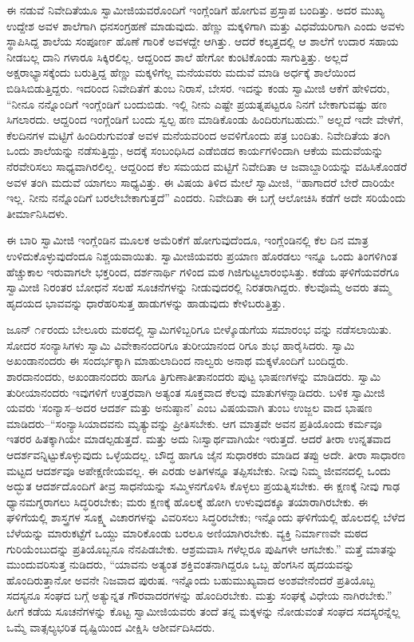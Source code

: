 ಈ ನಡುವೆ ನಿವೇದಿತೆಯೂ ಸ್ವಾಮೀಜಿಯವರೊಂದಿಗೆ ಇಂಗ್ಲೆಂಡಿಗೆ ಹೋಗುವ ಪ್ರಸ್ತಾಪ ಬಂದಿತ್ತು. ಅದರ ಮುಖ್ಯ ಉದ್ದೇಶ ಅವಳ ಶಾಲೆಗಾಗಿ ಧನಸಂಗ್ರಹಣೆ ಮಾಡುವುದು. ಹೆಣ್ಣು ಮಕ್ಕಳಿಗಾಗಿ ಮತ್ತು ವಿಧವೆಯರಿಗಾಗಿ ಎಂದು ಅವಳು ಸ್ಥಾಪಿಸಿದ್ದ ಶಾಲೆಯ ಸಂಪೂರ್ಣ ಹೊಣೆ ಗಾರಿಕೆ ಅವಳದ್ದೇ ಆಗಿತ್ತು. ಆದರೆ ಕಲ್ಕತ್ತದಲ್ಲಿ ಆ ಶಾಲೆಗೆ ಉದಾರ ಸಹಾಯ ನೀಡಬಲ್ಲ ದಾನಿ ಗಳಾರೂ ಸಿಕ್ಕಿರಲಿಲ್ಲ. ಆದ್ದರಿಂದ ಶಾಲೆ ಹೇಗೋ ಕುಂಟಿಕೊಂಡು ಸಾಗುತ್ತಿತ್ತು. ಅಲ್ಲದೆ ಅಕ್ಷರಾಭ್ಯಾಸಕ್ಕೆಂದು ಬರುತ್ತಿದ್ದ ಹೆಣ್ಣು ಮಕ್ಕಳಿಗೆಲ್ಲ ಮನೆಯವರು ಮದುವೆ ಮಾಡಿ ಅರ್ಧಕ್ಕೆ ಶಾಲೆಯಿಂದ ಬಿಡಿಸಿಬಿಡುತ್ತಿದ್ದರು. ಇದರಿಂದ ನಿವೇದಿತೆಗೆ ತುಂಬ ನಿರಾಸೆ, ಬೇಸರ. ಇದನ್ನು ಕಂಡು ಸ್ವಾಮೀಜಿ ಆಕೆಗೆ ಹೇಳಿದರು, “ನೀನೂ ನನ್ನೊಂದಿಗೆ ಇಂಗ್ಲೆಂಡಿಗೆ ಬಂದುಬಿಡು. ಇಲ್ಲಿ ನೀನು ಎಷ್ಟೇ ಪ್ರಯತ್ನಪಟ್ಟರೂ ನಿನಗೆ ಬೇಕಾಗುವಷ್ಟು ಹಣ ಸಿಗಲಾರದು. ಆದ್ದರಿಂದ ಇಂಗ್ಲೆಂಡಿಗೆ ಬಂದು ಸ್ವಲ್ಪ ಹಣ ಮಾಡಿಕೊಂಡು ಹಿಂದಿರುಗಬಹುದು.” ಅಲ್ಲದೆ ಇದೇ ವೇಳೆಗೆ, ಕೆಲದಿನಗಳ ಮಟ್ಟಿಗೆ ಹಿಂದಿರುಗುವಂತೆ ಅವಳ ಮನೆಯವರಿಂದ ಅವಳಿಗೊಂದು ಪತ್ರ ಬಂದಿತು. ನಿವೇದಿತೆಯ ತಂಗಿ ಒಂದು ಶಾಲೆಯನ್ನು ನಡೆಸುತ್ತಿದ್ದು, ಅದಕ್ಕೆ ಸಂಬಂಧಿಸಿದ ಎಡೆಬಿಡದ ಕಾರ್ಯಗಳಿಂದಾಗಿ ಆಕೆಯ ಮದುವೆಯನ್ನು ನೆರವೇರಿಸಲು ಸಾಧ್ಯವಾಗಿರಲಿಲ್ಲ. ಆದ್ದರಿಂದ ಕೆಲ ಸಮಯದ ಮಟ್ಟಿಗೆ ನಿವೇದಿತಾ ಆ ಜವಾಬ್ದಾರಿಯನ್ನು ವಹಿಸಿಕೊಂಡರೆ ಅವಳ ತಂಗಿ ಮದುವೆ ಯಾಗಲು ಸಾಧ್ಯವಿತ್ತು. ಈ ವಿಷಯ ತಿಳಿದ ಮೇಲೆ ಸ್ವಾಮೀಜಿ, “ಹಾಗಾದರೆ ಬೇರೆ ದಾರಿಯೇ ಇಲ್ಲ. ನೀನು ನನ್ನೊಂದಿಗೆ ಬರಲೇಬೇಕಾಗುತ್ತದೆ” ಎಂದರು. ನಿವೇದಿತಾ ಈ ಬಗ್ಗೆ ಆಲೋಚಿಸಿ ಕಡೆಗೆ ಅದೇ ಸರಿಯೆಂದು ತೀರ್ಮಾನಿಸಿದಳು.

ಈ ಬಾರಿ ಸ್ವಾಮೀಜಿ ಇಂಗ್ಲೆಂಡಿನ ಮೂಲಕ ಅಮೆರಿಕೆಗೆ ಹೋಗುವುದೆಂದೂ, ಇಂಗ್ಲೆಂಡಿನಲ್ಲಿ ಕೆಲ ದಿನ ಮಾತ್ರ ಉಳಿದುಕೊಳ್ಳುವುದೆಂದೂ ನಿಶ್ಚಯವಾಯಿತು. ಸ್ವಾಮೀಜಿಯವರು ಪ್ರಯಾಣ ಹೊರಡಲು ಇನ್ನೂ ಒಂದು ತಿಂಗಳಿಗಿಂತ ಹೆಚ್ಚುಕಾಲ ಇರುವಾಗಲೇ ಭಕ್ತರಿಂದ, ದರ್ಶನಾರ್ಥಿ ಗಳಿಂದ ಮಠ ಗಿಜಿಗುಟ್ಟಲಾರಂಭಿಸಿತ್ತು. ಕಡೆಯ ಘಳಿಗೆಯವರೆಗೂ ಸ್ವಾಮೀಜಿ ನಿರಂತರ ಬೋಧನೆ ಸಲಹೆ ಸೂಚನೆಗಳನ್ನು ನೀಡುವುದರಲ್ಲಿ ನಿರತರಾಗಿದ್ದರು. ಕೆಲವೊಮ್ಮೆ ಅವರು ತಮ್ಮ ಹೃದಯದ ಭಾವವನ್ನು ಧಾರೆಹರಿಸುತ್ತ ಹಾಡುಗಳನ್ನು ಹಾಡುವುದು ಕೇಳಿಬರುತ್ತಿತ್ತು.

ಜೂನ್ ೧೯ರಂದು ಬೇಲೂರು ಮಠದಲ್ಲಿ ಸ್ವಾಮಿಗಳಿಬ್ಬರಿಗೂ ಬೀಳ್ಕೊಡುಗೆಯ ಸಮಾರಂಭ ವನ್ನು ನಡೆಸಲಾಯಿತು. ಸೋದರ ಸಂನ್ಯಾಸಿಗಳು ಸ್ವಾಮಿ ವಿವೇಕಾನಂದರಿಗೂ ತುರೀಯಾನಂದ ರಿಗೂ ಶುಭ ಹಾರೈಸಿದರು. ಸ್ವಾಮಿ ಅಖಂಡಾನಂದರು ಈ ಸಂದರ್ಭಕ್ಕಾಗಿ ಮಾಹುಲಾದಿಂದ ನಾಲ್ವರು ಅನಾಥ ಮಕ್ಕಳೊಂದಿಗೆ ಬಂದಿದ್ದರು. ಶಾರದಾನಂದರು, ಅಖಂಡಾನಂದರು ಹಾಗೂ ತ್ರಿಗುಣಾತೀತಾನಂದರು ಪುಟ್ಟ ಭಾಷಣಗಳನ್ನು ಮಾಡಿದರು. ಸ್ವಾಮಿ ತುರೀಯಾನಂದರು ಇವುಗಳಿಗೆ ಉತ್ತರವಾಗಿ ಅತ್ಯಂತ ಸೂಕ್ತವಾದ ಕೆಲವು ಮಾತುಗಳನ್ನಾಡಿದರು. ಬಳಿಕ ಸ್ವಾಮೀಜಿ ಯವರು ‘ಸಂನ್ಯಾಸ–ಅದರ ಆದರ್ಶ ಮತ್ತು ಅನುಷ್ಠಾನ’ ಎಂಬ ವಿಷಯವಾಗಿ ತುಂಬ ಉಜ್ಜಲ ವಾದ ಭಾಷಣ ಮಾಡಿದರು–“ಸಂನ್ಯಾಸಿಯಾದವನು ಮೃತ್ಯುವನ್ನು ಪ್ರೀತಿಸಬೇಕು. ಆಗ ಮಾತ್ರವೇ ಅವನ ಪ್ರತಿಯೊಂದು ಕರ್ಮವೂ ಇತರರ ಹಿತಕ್ಕಾಗಿಯೇ ಮಾಡಲ್ಪಡುತ್ತದೆ. ಮತ್ತು ಅದು ನಿಃಸ್ವಾರ್ಥವಾಗಿಯೇ ಇರುತ್ತದೆ. ಆದರೆ ತೀರಾ ಉನ್ನತವಾದ ಆದರ್ಶವನ್ನಿಟ್ಟುಕೊಳ್ಳುವುದು ಒಳ್ಳೆಯದಲ್ಲ. ಬೌದ್ಧ ಹಾಗೂ ಜೈನ ಸುಧಾರಕರು ಮಾಡಿದ ತಪ್ಪು ಅದೇ. ತೀರಾ ಸಾಧಾರಣ ಮಟ್ಟದ ಆದರ್ಶವೂ ಅಪೇಕ್ಷಣೀಯವಲ್ಲ. ಈ ಎರಡು ಅತಿಗಳನ್ನೂ ತಪ್ಪಿಸಬೇಕು. ನೀವು ನಿಮ್ಮ ಜೀವನದಲ್ಲಿ ಒಂದು ಅದ್ಭುತ ಆದರ್ಶದೊಂದಿಗೆ ತೀವ್ರ ಸಾಧನೆಯನ್ನು ಸಮ್ಮಿಳನಗೊಳಿಸಿ ಕೊಳ್ಳಲು ಪ್ರಯತ್ನಿಸಬೇಕು. ಈ ಕ್ಷಣಕ್ಕೆ ನೀವು ಗಾಢ ಧ್ಯಾನಮಗ್ನರಾಗಲು ಸಿದ್ಧರಿರಬೇಕು; ಮರು ಕ್ಷಣಕ್ಕೆ ಹೊಲಕ್ಕೆ ಹೋಗಿ ಉಳುವುದಕ್ಕೂ ತಯಾರಾಗಿರಬೇಕು. ಈ ಘಳಿಗೆಯಲ್ಲಿ ಶಾಸ್ತ್ರಗಳ ಸೂಕ್ಷ್ಮ ವಿಚಾರಗಳನ್ನು ವಿವರಿಸಲು ಸಿದ್ಧರಿರಬೇಕು; ಇನ್ನೊಂದು ಘಳಿಗೆಯಲ್ಲಿ ಹೊಲದಲ್ಲಿ ಬೆಳೆದ ಬೆಳೆಯನ್ನು ಮಾರುಕಟ್ಟೆಗೆ ಒಯ್ದು ಮಾರಿಕೊಂಡು ಬರಲೂ ಅಣಿಯಾಗಿರಬೇಕು. ವ್ಯಕ್ತಿ ನಿರ್ಮಾಣವೇ ಮಠದ ಗುರಿಯೆಂಬುದನ್ನು ಪ್ರತಿಯೊಬ್ಬನೂ ನೆನಪಿಡಬೇಕು. ಆಶ್ರಮವಾಸಿ ಗಳೆಲ್ಲರೂ ಪುಷಿಗಳೇ ಆಗಬೇಕು.” ಮತ್ತೆ ಮಾತನ್ನು ಮುಂದುವರಿಸುತ್ತ ನುಡಿದರು, “ಯಾವನು ಅತ್ಯಂತ ಶಕ್ತಿವಂತನಾಗಿದ್ದರೂ ಒಬ್ಬ ಹೆಂಗಸಿನ ಹೃದಯವನ್ನು ಹೊಂದಿರುತ್ತಾನೋ ಅವನೇ ನಿಜವಾದ ಪುರುಷ. ಇನ್ನೊಂದು ಬಹುಮುಖ್ಯವಾದ ಅಂಶವೇನೆಂದರೆ ಪ್ರತಿಯೊಬ್ಬ ಸದಸ್ಯನೂ ಸಂಘದ ಬಗ್ಗೆ ಅತ್ಯುನ್ನತ ಗೌರವಾದರಗಳನ್ನು ಹೊಂದಿರಬೇಕು. ಮತ್ತು ಸಂಘಕ್ಕೆ ವಿಧೇಯ ನಾಗಿರಬೇಕು.” ಹೀಗೆ ಕಡೆಯ ಸೂಚನೆಗಳನ್ನು ಕೊಟ್ಟ ಸ್ವಾಮೀಜಿಯವರು ತಂದೆ ತನ್ನ ಮಕ್ಕಳನ್ನು ನೋಡುವಂತೆ ಸಂಘದ ಸದಸ್ಯರನ್ನೆಲ್ಲ ಒಮ್ಮೆ ವಾತ್ಸಲ್ಯಭರಿತ ದೃಷ್ಟಿಯಿಂದ ವೀಕ್ಷಿಸಿ ಆಶೀರ್ವದಿಸಿದರು.

